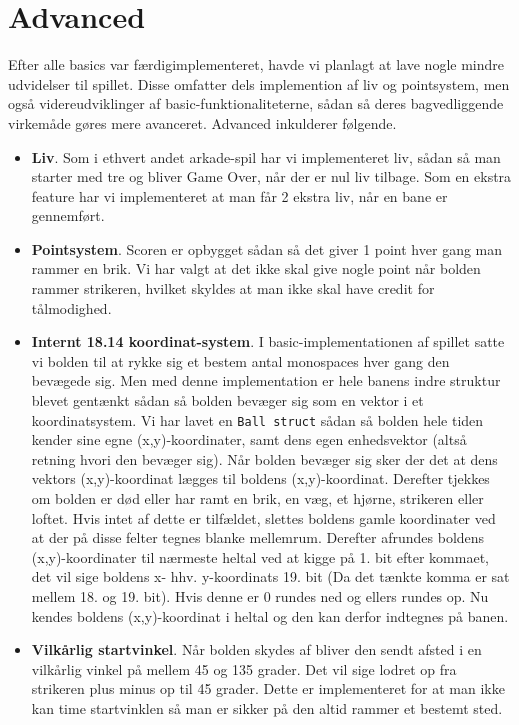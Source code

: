 \begin{itemize}
\end{itemize}

\section{Advanced}
Efter alle basics var færdigimplementeret, havde vi planlagt at lave nogle mindre udvidelser til spillet. Disse omfatter dels implemention af liv og pointsystem, men også videreudviklinger af basic-funktionaliteterne, sådan så deres bagvedliggende virkemåde gøres mere avanceret. Advanced inkulderer følgende.

\begin{itemize}
\item \textbf{Liv}. Som i ethvert andet arkade-spil har vi implementeret liv, sådan så man starter med tre og bliver Game Over, når der er nul liv tilbage. Som en ekstra feature har vi implementeret at man får 2 ekstra liv, når en bane er gennemført.

\item \textbf{Pointsystem}. Scoren er opbygget sådan så det giver 1 point hver gang man rammer en brik. Vi har valgt at det ikke skal give nogle point når bolden rammer strikeren, hvilket skyldes at man ikke skal have credit for tålmodighed.

\item \textbf{Internt 18.14 koordinat-system}. I basic-implementationen af spillet satte vi bolden til at rykke sig et bestem antal monospaces hver gang den bevægede sig. Men med denne implementation er hele banens indre struktur blevet gentænkt sådan så bolden bevæger sig som en vektor i et koordinatsystem. Vi har lavet en \texttt{Ball struct} sådan så bolden hele tiden kender sine egne (x,y)-koordinater, samt dens egen enhedsvektor (altså retning hvori den bevæger sig). Når bolden bevæger sig sker der det at dens vektors (x,y)-koordinat lægges til boldens (x,y)-koordinat. Derefter tjekkes om bolden er død eller har ramt en brik, en væg, et hjørne, strikeren eller loftet. Hvis intet af dette er tilfældet, slettes boldens gamle koordinater ved at der på disse felter tegnes blanke mellemrum. Derefter afrundes boldens (x,y)-koordinater til nærmeste heltal ved at kigge på 1. bit efter kommaet, det vil sige boldens x- hhv. y-koordinats 19. bit (Da det tænkte komma er sat mellem 18. og 19. bit). Hvis denne er 0 rundes ned og ellers rundes op. Nu kendes boldens (x,y)-koordinat i heltal og den kan derfor indtegnes på banen.

\item \textbf{Vilkårlig startvinkel}. Når bolden skydes af bliver den sendt afsted i en vilkårlig vinkel på mellem 45 og 135 grader. Det vil sige lodret op fra strikeren plus minus op til 45 grader. Dette er implementeret for at man ikke kan time startvinklen så man er sikker på den altid rammer et bestemt sted.


\end{itemize}
